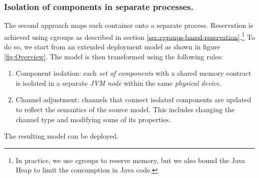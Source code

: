 \subsubsection{Isolation of components in separate processes.}
The second approach maps each container onto a separate process.
Reservation is achieved using cgroups as described in section \ref{sec:cgroups-based-reservation}.\footnote{In practice, we use cgroups to reserve memory, but we also bound the Java Heap to limit the consumption in Java code.}
%
To do so, we start from an extended deployment model as shown in figure \ref{fig:Overview}.
The model is then transformed using the following rules:
\begin{enumerate}
\item  Component isolation: each \textit{set of components} with a shared memory contract is isolated in a separate \textit{JVM node} within the same \textit{physical device}.
\label{rule1-model-transformation} 

\item Channel adjustment: channels that connect isolated components are updated to reflect the semantics of the source model. This includes changing the channel type and modifying some of its properties.
\end{enumerate}
The resulting model can be deployed.



